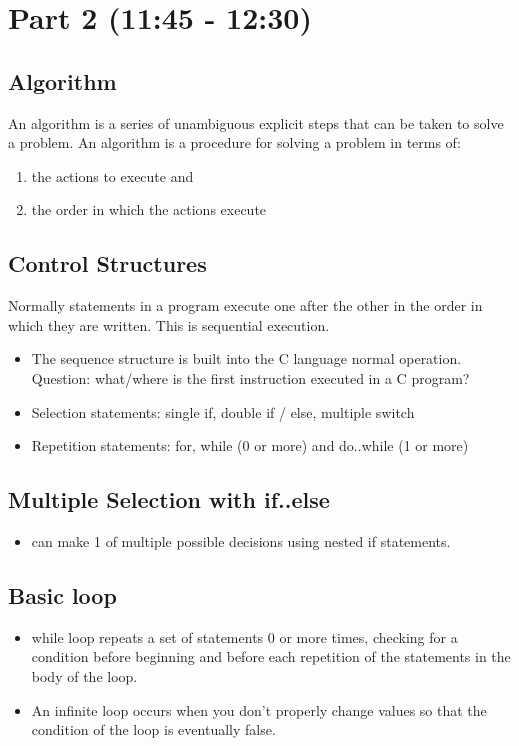 \documentclass[11pt]{article}
\begin{document}
\section{Part 2 (11:45 - 12:30)}
\label{sec-2}
\subsection{Algorithm}
\label{sec-2-1}

An algorithm is a series of unambiguous explicit steps that can be taken to solve a problem.
An algorithm is a procedure for solving a problem in terms of:

\begin{enumerate}
\item the actions to execute and
\item the order in which the actions execute
\end{enumerate}
\subsection{Control Structures}
\label{sec-2-2}

Normally statements in a program execute one after the other in the
order in which they are written.  This is sequential execution.

\begin{itemize}
\item The sequence structure is built into the C language normal operation.
  Question: what/where is the first instruction executed in a C program?
\item Selection statements: single if, double if / else, multiple switch
\item Repetition statements: for, while (0 or more) and do..while (1 or more)
\end{itemize}
\subsection{Multiple Selection with if..else}
\label{sec-2-3}

\begin{itemize}
\item can make 1 of multiple possible decisions using nested if statements.
\end{itemize}
\subsection{Basic loop}
\label{sec-2-4}

\begin{itemize}
\item while loop repeats a set of statements 0 or more times, checking for
  a condition before beginning and before each repetition of the
  statements in the body of the loop.
\item An infinite loop occurs when you don't properly change values so
  that the condition of the loop is eventually false.
\end{itemize}
\end{document}
